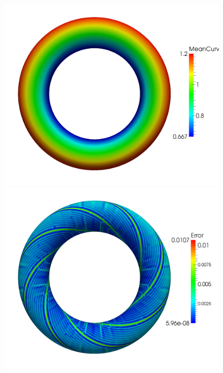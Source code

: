   \begin{figure}
    \begin{minipage}[t]{0.49\textwidth}
          \centering\includegraphics[width=\textwidth]{bilder/Curvature/WeinMeanTorus_25k.png}
        \end{minipage} \hfill
        \begin{minipage}[t]{0.49\textwidth}
          \centering\includegraphics[width=\textwidth]{bilder/Curvature/WeinMeanTorusError_25k.png}
        \end{minipage}

\end{figure}
